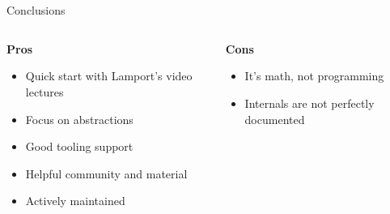 \section*{}
\begin{frame}{Conclusions}
    \begin{columns}[t]
        \begin{column}{0.5\textwidth}
            \textbf{Pros}
            \begin{itemize}
                \item Quick start with Lamport's video lectures %
                \item Focus on abstractions
                \item Good tooling support
                \item Helpful community and material
                \item Actively maintained
            \end{itemize}
        \end{column}
        \begin{column}{0.5\textwidth}
            \textbf{Cons}
            \begin{itemize}
                \item It's math, not programming
                \item Internals are not perfectly documented
            \end{itemize}
        \end{column}
        \end{columns}
\end{frame}
